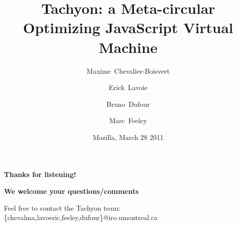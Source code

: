 \documentclass{beamer}
\title[Tachyon Overview]{Tachyon: a Meta-circular Optimizing JavaScript Virtual Machine}
\author[Chevalier-Boisvert, Lavoie, Dufour, Feeley]
{
  Maxime~Chevalier-Boisvert \and
  Erick~Lavoie \and
  Bruno~Dufour \and
  Marc~Feeley
}
\institute[UdeM]
{
  DIRO\\
  Universit\'e de Montr\'eal, Canada
}
\date[Mozilla 2011]
{Mozilla, March 28 2011}
\begin{document}
\begin{frame}
  \titlepage
\end{frame}






\begin{frame}{}
\begin{center}
{\huge\bfseries Thanks for listening!}

\vspace{5mm}%
{\large\bfseries We welcome your questions/comments}

\vspace{5mm}%
Feel free to contact the Tachyon team:\\
{\small\ttfamily \{chevalma,lavoeric,feeley,dufour\}@iro.umontreal.ca}
\end{center}
\end{frame}
\end{document}
